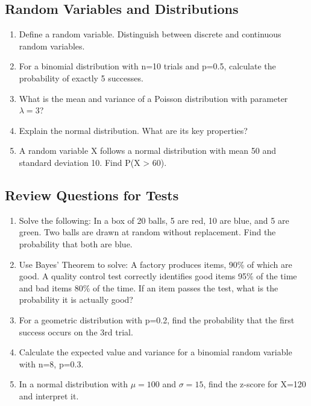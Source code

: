 \subsection{Random Variables and Distributions}

\begin{enumerate}
    \item Define a random variable. Distinguish between discrete and continuous random variables.
    
    \item For a binomial distribution with n=10 trials and p=0.5, calculate the probability of exactly 5 successes.
    
    \item What is the mean and variance of a Poisson distribution with parameter $\lambda=3$?
    
    \item Explain the normal distribution. What are its key properties?
    
    \item A random variable X follows a normal distribution with mean 50 and standard deviation 10. Find P(X > 60).
\end{enumerate}

\subsection{Review Questions for Tests}

\begin{enumerate}
    \item Solve the following: In a box of 20 balls, 5 are red, 10 are blue, and 5 are green. Two balls are drawn at random without replacement. Find the probability that both are blue.
    
    \item Use Bayes' Theorem to solve: A factory produces items, 90\% of which are good. A quality control test correctly identifies good items 95\% of the time and bad items 80\% of the time. If an item passes the test, what is the probability it is actually good?
    
    \item For a geometric distribution with p=0.2, find the probability that the first success occurs on the 3rd trial.
    
    \item Calculate the expected value and variance for a binomial random variable with n=8, p=0.3.
    
    \item In a normal distribution with $\mu=100$ and $\sigma=15$, find the z-score for X=120 and interpret it.
\end{enumerate}

